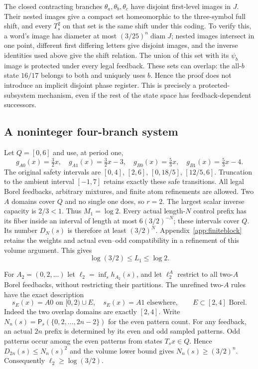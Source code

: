 \documentclass[11pt,reqno]{amsart}
\numberwithin{equation}{section}
\theoremstyle{definition}
\theoremstyle{definition}
\newcommand{\Patt}{\mathsf P}
\begin{document}
The closed contracting branches $\theta_a,\theta_b,\theta_c$
have disjoint first-level images in $J$. Their nested images give
a compact set homeomorphic to the three-symbol full shift, and
every $T_s^2$ on that set is the same shift under this coding.
To verify this, a word's image has diameter at most
$(3/25)^n\operatorname{diam}J$; nested images intersect in one
point, different first differing letters give disjoint images, and
the inverse identities used above give the shift relation.
The union of this set with its $\psi_b$ image is protected under
every legal feedback. These sets can overlap: the all-$b$ state
$16/17$ belongs to both and uniquely uses $b$. Hence the proof
does not introduce an implicit disjoint phase register. This is
precisely a protected-subsystem mechanism, even if the rest of the
state space has feedback-dependent successors.

\subsection{A noninteger four-branch system}
\label{subsec:four-affine}
Let $Q=[0,6]$ and use, at period one,
\[
 g_{A0}(x)=\tfrac32x,\quad g_{A1}(x)=\tfrac32x-3,
 \quad g_{B0}(x)=\tfrac53x,\quad g_{B1}(x)=\tfrac53x-4.
\]
The original safety intervals are
$[0,4]$, $[2,6]$, $[0,18/5]$, $[12/5,6]$.
Truncation to the ambient interval $[-1,7]$ retains exactly these
safe transitions. All legal Borel feedbacks, arbitrary mixtures,
and finite atom refinements are allowed. Two $A$ domains cover
$Q$ and no single one does, so $r=2$. The largest scalar
inverse capacity is $2/3<1$. Thus $M_1=\log2$.
Every actual length-$N$ control prefix has its fiber inside an
interval of length at most $6(3/2)^{-N}$; these intervals cover
$Q$. Its number $D_N(s)$ is therefore at least $(3/2)^N$.
Appendix~\ref{app:finiteblock} retains the weights and actual
even--odd compatibility in a refinement of this volume argument.
This gives
\begin{equation}\label{eq:four-L}
 \log(3/2)\le L_1\le\log2.
\end{equation}

For $A_2=(0,2,\ldots)$ let
$\ell_2=\inf_s h_{A_2}(s)$, and let $\ell_2^A$ restrict to
all two-$A$ Borel feedbacks, without restricting their partitions.
The unrefined two-$A$ rules have the exact description
\[
 s_E(x)=A0\text{ on }[0,2)\cup E,
 \quad s_E(x)=A1\text{ elsewhere},\qquad E\subset[2,4]
 \text{ Borel}.
\]
Indeed the two overlap domains are exactly $[2,4]$.
Write $N_n(s)=\Patt_s(\{0,2,\ldots,2n-2\})$ for the even
pattern count. For any feedback, an actual $2n$ prefix is determined
by its even and odd sampled patterns. Odd patterns occur among the even
patterns from states $T_sx\in Q$. Hence
$D_{2n}(s)\le N_n(s)^2$ and the volume lower bound gives
$N_n(s)\ge(3/2)^n$. Consequently $\ell_2\ge\log(3/2)$.
\end{document}

